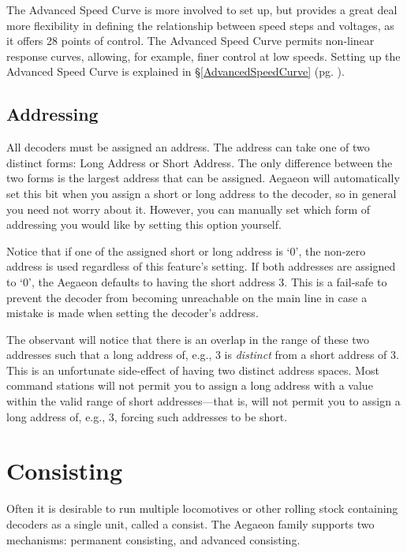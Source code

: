 \documentclass[12pt,letterpaper,draft]{memoir} %
\begin{document}
The Advanced Speed Curve is more involved to set up, but provides a great deal more flexibility in defining the relationship between speed steps and voltages, as it offers 28 points of control. The Advanced Speed Curve permits non-linear response curves, allowing, for example, finer control at low speeds. Setting up the Advanced Speed Curve is explained in \S\ref{AdvancedSpeedCurve} (pg. \pageref{AdvancedSpeedCurve}).

\subsection{Addressing}
All decoders must be assigned an address. The address can take one of two distinct forms: Long Address or Short Address. The only difference between the two forms is the largest address that can be assigned. Aegaeon will automatically set this bit when you assign a short or long address to the decoder, so in general you need not worry about it. However, you can manually set which form of addressing you would like by setting this option yourself.

Notice that if one of the assigned short or long address is `0', the non-zero address is used regardless of this feature's setting. If both addresses are assigned to `0', the Aegaeon defaults to having the short address 3. This is a fail-safe to prevent the decoder from becoming unreachable on the main line in case a mistake is made when setting the decoder's address.

The observant will notice that there is an overlap in the range of these two addresses such that a long address of, e.g., 3 is \textit{distinct} from a short address of 3. This is an unfortunate side-effect of having two distinct address spaces. Most command stations will not permit you to assign a long address with a value within the valid range of short addresses---that is, will not permit you to assign a long address of, e.g., 3, forcing such addresses to be short.

\section{Consisting}
\label{consisting}
Often it is desirable to run multiple locomotives or other rolling stock containing decoders as a single unit, called a consist. The Aegaeon family supports two mechanisms: permanent consisting, and advanced consisting.
\end{document}
